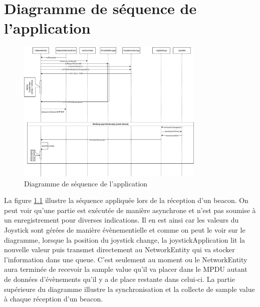 \documentclass{report}
\begin{document}
\chapter{Diagramme de séquence de l'application}
\begin{figure}[H]
    \centering
    \includegraphics[width= 0.8\textwidth]{Images/SequenceDiagram.png}
    \caption{Diagramme de séquence de l'application}
    \label{fig:SequenceDiagram}
\end{figure}
La figure \ref{fig:SequenceDiagram} illustre la séquence appliquée lors de la réception d'un beacon. On peut voir qu'une partie est exécutée de manière asynchrone et n'est pas soumise à un enregistrement pour diverses indications. Il en est ainsi car les valeurs du Joystick sont gérées de manière évènementielle et comme on peut le voir sur le diagramme, lorsque la position du joystick change, la joystickApplication lit la nouvelle valeur puis transmet directement au NetworkEntity qui va stocker l'information dans une queue. C'est seulement au moment ou le NetworkEntity aura terminée de recevoir la sample value qu'il va placer dans le MPDU autant de données d'évènements qu'il y a de place restante dans celui-ci. La partie supérieure du diagramme illustre la synchronisation et la collecte de sample value à chaque réception d'un beacon.
\end{document}
